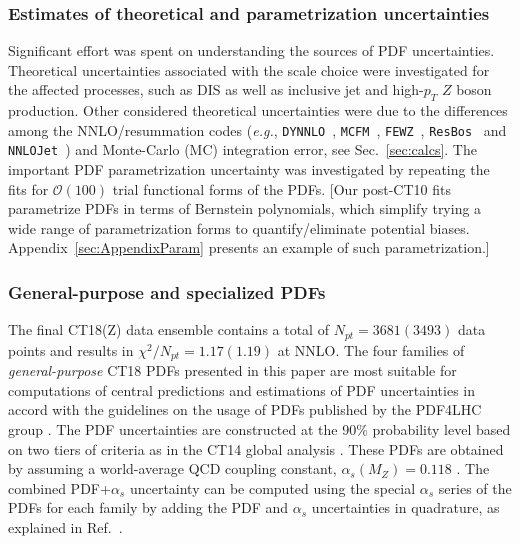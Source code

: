 \subsubsection{Estimates of theoretical and parametrization uncertainties}
Significant effort was spent on understanding the sources
of PDF uncertainties. Theoretical uncertainties associated with the
scale choice were investigated for the affected processes, such as
DIS as well as inclusive jet and high-$p_{T}$ $Z$ boson production. Other considered theoretical uncertainties were due 
to the differences among the NNLO/resummation codes ({\it e.g.}, \texttt{DYNNLO}~\cite{Catani:2007vq,Catani:2009sm}, 
\texttt{MCFM}~\cite{Campbell:2010ff, Boughezal:2016wmq, MCFM8}, 
\texttt{FEWZ}~\cite{Gavin:2010az, Gavin:2012sy, Li:2012wna},
\texttt{ResBos}~\cite{Ladinsky:1993zn, Balazs:1997xd}
and \texttt{NNLOJet}~\cite{Ridder:2015dxa,Gehrmann-DeRidder:2017mvr,Currie:2016bfm,Currie:2017ctp}) and Monte-Carlo (MC) integration error, see Sec.~\ref{sec:calcs}.
The important PDF parametrization uncertainty was investigated by repeating
the fits for $\mathcal{O}(100)$ trial functional forms of the PDFs. [Our post-CT10
fits parametrize PDFs in terms of Bernstein polynomials, which simplify
trying a wide range of parametrization forms to quantify/eliminate
potential biases. Appendix~\ref{sec:AppendixParam} presents an example of such parametrization.]

\subsubsection{General-purpose and specialized PDFs \label{sec:General-purpose}}
The final CT18(Z) data ensemble contains a total of $N_\mathit{pt}\! =\! 3681(3493)$ data points and results in $\chi^2/N_\mathit{pt}=1.17 (1.19)$ at NNLO.
The four families of {\it general-purpose} CT18 PDFs presented in this paper are most suitable for computations of central predictions and estimations of PDF uncertainties in accord with the guidelines on the usage of PDFs published by the PDF4LHC group \cite{Butterworth:2015oua}. The PDF uncertainties are constructed at the 90\% probability level based on two tiers of criteria as in the CT14 global analysis \cite{Dulat:2015mca}.  These PDFs are obtained by assuming a world-average QCD coupling constant, $\alpha_s(M_Z)=0.118$ \cite{Tanabashi:2018oca}. The combined PDF+$\alpha_s$ uncertainty can be computed using the special $\alpha_s$ series of the PDFs for each family by adding the PDF and $\alpha_s$ uncertainties in quadrature, as explained in Ref.~\cite{Lai:2010nw}.

